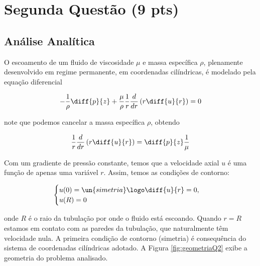 
\section{Segunda Questão (9 pts)}

\subsection{Análise Analítica}


O escoamento de um fluido de viscosidade $\mu$ e massa específica $\rho$,
plenamente desenvolvido em regime permanente, em coordenadas cilíndricas,
é modelado pela equação diferencial

\[ -\frac{1}{\rho} \diff{p}{z} + \frac{\mu}{\rho} \frac{1}{r} \frac{d}{dr} \left(r\diff{u}{r}\right) = 0 \]

\noindent note que podemos cancelar a massa específica $\rho$, obtendo

\begin{equation}\label{eq:modeloQ2}
    \frac{1}{r} \frac{d}{dr} \left(r\diff{u}{r}\right) = \diff{p}{z} \frac{1}{\mu}
\end{equation}

Com um gradiente de pressão constante, temos que a velocidade axial $u$
é uma função de apenas uma variável $r$. Assim, temos as condições de contorno:

\begin{equation}\label{eq:modeloQ2Contorno}
    \begin{cases}
        u(0) = \un{simetria} \logo \diff{u}{r} = 0, \\
        u(R) = 0                                    \\
    \end{cases}
\end{equation}

\noindent onde $R$ é o raio da tubulação por onde o fluido está escoando. Quando
$r = R$ estamos em contato com as paredes da tubulação, que naturalmente têm
velocidade nula. A primeira condição de contorno (simetria) é consequência do sistema de coordenadas
cilíndricas adotado. A Figura \ref*{fig:geometriaQ2} exibe a geometria do problema analisado.

